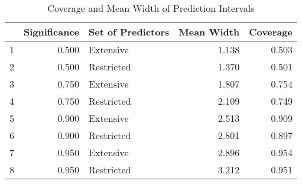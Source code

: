 \begin{table}[ht]
\centering
\begin{tabular}{rrlrr}
  \toprule
 & Significance & Set of Predictors & Mean Width & Coverage \\ 
  \midrule
1 & 0.500 & Extensive & 1.138 & 0.503 \\ 
  2 & 0.500 & Restricted & 1.370 & 0.501 \\ 
  3 & 0.750 & Extensive & 1.807 & 0.754 \\ 
  4 & 0.750 & Restricted & 2.109 & 0.749 \\ 
  5 & 0.900 & Extensive & 2.513 & 0.909 \\ 
  6 & 0.900 & Restricted & 2.801 & 0.897 \\ 
  7 & 0.950 & Extensive & 2.896 & 0.954 \\ 
  8 & 0.950 & Restricted & 3.212 & 0.951 \\ 
   \bottomrule
\end{tabular}
\caption{Coverage and Mean Width of Prediction Intervals} 
\end{table}
